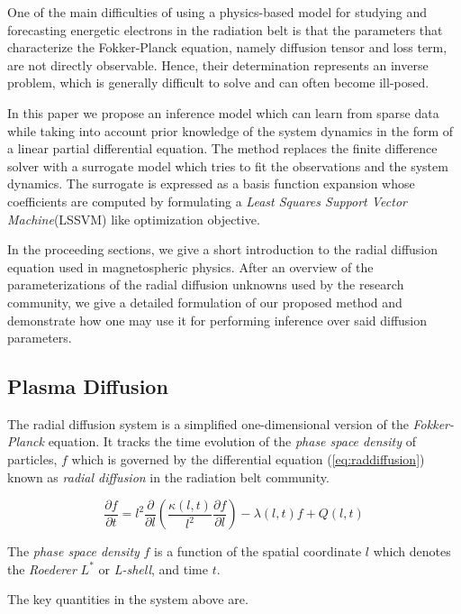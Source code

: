 \documentclass{article}
\begin{document}
One of the main difficulties of using a physics-based model for studying and 
forecasting energetic electrons in the radiation belt is that the parameters 
that characterize the Fokker-Planck equation, namely diffusion tensor and loss term,
are not directly observable. Hence, their determination represents an inverse problem,
which is generally difficult to solve and can often become ill-posed. 

In this paper we propose an inference model which can learn from sparse
data while taking into account prior knowledge of the system dynamics
in the form of a linear partial differential equation. The method replaces
the finite difference solver with a surrogate model which tries to fit
the observations and the system dynamics. The surrogate is expressed as
a basis function expansion whose coefficients are computed by formulating
a \emph{Least Squares Support Vector Machine}(LSSVM) like optimization
objective.

In the proceeding sections, we give a short introduction to the radial 
diffusion equation used in magnetospheric physics. After an overview of 
the parameterizations of the radial diffusion unknowns used by the research community, 
we give a detailed formulation of our proposed method and demonstrate 
how one may use it for performing inference over said diffusion parameters.

\subsection{Plasma Diffusion}

The radial diffusion system is a simplified one-dimensional version of
the \emph{Fokker-Planck} equation. It tracks the time evolution of the
\emph{phase space density} of particles, $f$ which is governed by the
differential equation (\ref{eq:raddiffusion}) known as \emph{radial
  diffusion} in the radiation belt community\citep{JGRA:JGRA9345}.

\begin{equation}\label{eq:raddiffusion}
  \frac{\partial{f}}{\partial{t}} = l^2 \frac{\partial}{\partial{l}}\left( \frac{\kappa(l,
      t)}{l^{2}} \frac{\partial{f}}{\partial{l}} \right) - \lambda(l,
  t) f +  Q(l, t)
\end{equation}

The \emph{phase space density} $f$ is a function of the spatial
coordinate $l$ which denotes the \emph{Roederer} $L^*$ or
\emph{L-shell}, and time $t$.

The key quantities in the system above are.
\end{document}
